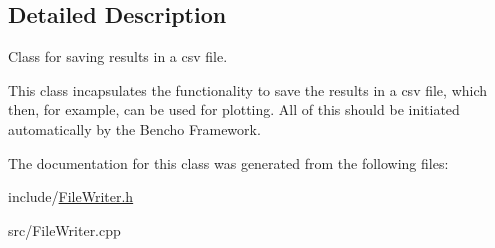 \subsection{Detailed Description}
Class for saving results in a csv file. 

This class incapsulates the functionality to save the results in a csv file, which then, for example, can be used for plotting. All of this should be initiated automatically by the Bencho Framework. 

The documentation for this class was generated from the following files\-:\begin{DoxyCompactItemize}
\item 
include/\hyperlink{FileWriter_8h}{File\-Writer.\-h}\item 
src/File\-Writer.\-cpp\end{DoxyCompactItemize}
